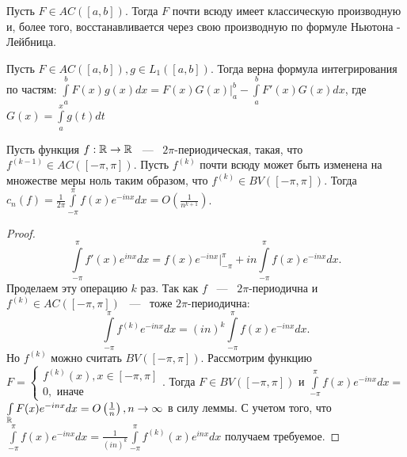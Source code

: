 \begin{theorem}[б/д]
    Пусть $F \in AC([a, b])$. Тогда $F$ почти всюду имеет классическую производную и, более того, восстанавливается через свою производную по формуле Ньютона - Лейбница. 
\end{theorem}

\begin{theorem}
    Пусть $F \in AC([a, b]), g \in L_1([a, b])$. Тогда верна формула интегрирования по частям: $\int\limits_{a}^{b} F(x)g(x) dx = F(x)G(x)\big|_{a}^{b} - \int\limits_{a}^{b} F'(x)G(x) dx$, \newline где $G(x) = \int\limits_a^{x} g(t)dt $
\end{theorem}

\begin{corollary}
    Пусть функция $f: \mathbb{R} \rightarrow \mathbb{R}$ ~---~ $2\pi$-периодическая, такая, что $f^{(k - 1)} \in AC([-\pi, \pi])$. Пусть $f^{(k)}$ почти всюду может быть изменена на множестве меры ноль таким образом, что $f^(k) \in BV([-\pi, \pi])$. Тогда $c_n(f) = \frac{1}{2\pi} \int\limits_{-\pi}^{\pi} f(x) e^{-inx} dx = O\left(\frac{1}{n^{k + 1}}\right)$.
\end{corollary}

\begin{proof}
    $$
    \int\limits_{-\pi}^{\pi} f'(x) e^{inx} dx = f(x) e^{-inx} \big|_{-\pi}^{\pi} + in \int\limits_{-\pi}^{\pi} f(x) e^{-inx} dx.
    $$
    Проделаем эту операцию $k$ раз. Так как $f$ ~---~ $2\pi$-периодична и $f^{(k)} \in AC([-\pi, \pi])$ ~---~ тоже $2\pi$-периодична: 
    $$
    \int\limits_{-\pi}^{\pi} f^{(k)}e^{-inx} dx = (in)^k \int\limits_{-\pi}^{\pi} f(x)e^{-inx} dx.
    $$
    Но $f^{(k)}$ можно считать $BV([-\pi, \pi])$. \newline
    Рассмотрим функцию $F = 
    \begin{cases}
        f^{(k)}(x), x \in [-\pi, \pi] \\ 
        0, \text{ иначе}
    \end{cases}
    $. Тогда $F \in BV([-\pi, \pi])$ и $\int\limits_{-\pi}^{\pi}f(x) e^{-inx} dx = $ $ \int\limits_{\mathbb{R}} F(x) e^{-inx} dx = O\left(\frac{1}{n}\right), n \rightarrow \infty$ в силу леммы. 
    С учетом того, что $\int\limits_{-\pi}^{\pi} f(x)e^{-inx} dx = \frac{1}{(in)^k}\int\limits_{-\pi}^{\pi} f^{(k)}(x) e^{inx} dx$ получаем требуемое.
    
\end{proof}
